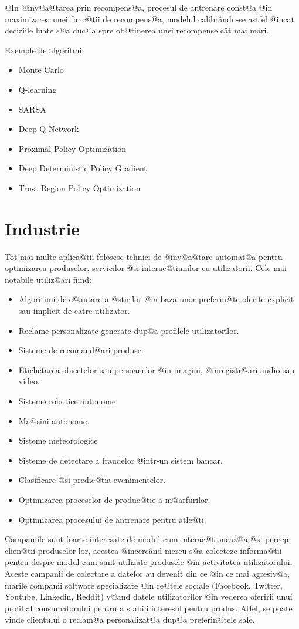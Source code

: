 @In @inv@a@tarea prin recompens@a, procesul de antrenare const@a @in maximizarea unei func@tii de recompens@a, modelul calibr\^ andu-se astfel @incat deciziile luate s@a duc@a spre ob@tinerea unei recompense c\^ at mai mari.

Exemple de algoritmi:
\begin{itemize}
	\item Monte Carlo
	\item Q-learning
	\item SARSA
	\item Deep Q Network
	\item Proximal Policy Optimization
	\item Deep Deterministic Policy Gradient
	\item Trust Region Policy Optimization
\end{itemize}

\section{Industrie}

	Tot mai multe aplica@tii folosesc tehnici de @inv@a@tare automat@a pentru optimizarea produselor, servicilor @si interac@tiunilor cu utilizatorii. Cele mai notabile utiliz@ari fiind:
\begin{itemize}
	\item Algoritimi de c@autare a @stirilor @in baza unor preferin@te oferite explicit sau implicit de catre utilizator.
	\item Reclame personalizate generate dup@a profilele utilizatorilor.
	\item Sisteme de recomand@ari produse.
	\item Etichetarea obiectelor sau persoanelor @in imagini, @inregistr@ari audio sau video.
	\item Sisteme robotice autonome.
	\item Ma@sini autonome.
	\item Sisteme meteorologice
	\item Sisteme de detectare a fraudelor @intr-un sistem bancar.
	\item Clasificare @si predic@tia evenimentelor. 
	\item Optimizarea proceselor de produc@tie a m@arfurilor.
	\item Optimizarea procesului de antrenare pentru atle@ti.
\end{itemize}

	Companiile sunt foarte interesate de modul cum interac@tioneaz@a @si percep clien@tii produselor lor, acestea @incerc\^ and mereu s@a colecteze informa@tii pentru despre modul cum sunt utilizate produsele @in activitatea utilizatorului. Aceste campanii de colectare a datelor au devenit din ce @in ce mai agresiv@a, marile companii software specializate @in re@tele sociale (Facebook, Twitter, Youtube, Linkedin, Reddit) v@and datele utilizatorilor @in vederea oferirii unui profil al consumatorului pentru a stabili interesul pentru produs. Atfel, se poate vinde clientului o reclam@a personalizat@a dup@a preferin@tele sale. 
	 
